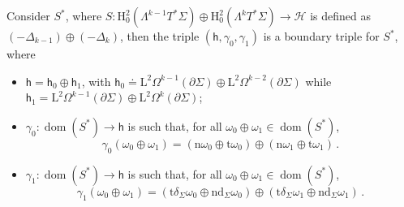 \begin{proposition}\label{Prop: boundary triples for S}
	Consider $S^*$, where $S:\mathrm{H}^2_0(\Lambda^{k-1}T^*\Sigma)\oplus \mathrm{H}^2_0(\Lambda^kT^*\Sigma)\to \mathcal{H}$ is defined as $(-\Delta_{k-1})\oplus(-\Delta_k)$, then the triple $(\mathsf{h},\gamma_0,\gamma_1)$ is a boundary triple for $S^*$, where
	\begin{itemize}
		\item
		$\mathsf{h}=\mathsf{h}_0\oplus\mathsf{h}_1$, with $\mathsf{h}_0\doteq \mathrm{L}^2\Omega^{k-1}(\partial\Sigma)\oplus \mathrm{L}^2\Omega^{k-2}(\partial\Sigma)$ while $\mathsf{h}_1=\mathrm{L}^2\Omega^{k-1}(\partial\Sigma)\oplus \mathrm{L}^2\Omega^{k}(\partial\Sigma)$; 
		\item
		$\gamma_0:\operatorname{dom}(S^*)\to\mathsf{h}$ is such that, for all $\omega_0\oplus\omega_1\in \operatorname{dom}(S^*)$, 
		\begin{equation}\label{Eq: gamma0}
		\gamma_0(\omega_0\oplus\omega_1)= (\mathrm{n}\omega_0\oplus
		\mathrm{t}\omega_0)\oplus
		(\mathrm{n}\omega_1\oplus
		\mathrm{t}\omega_1)\,.
		\end{equation}
		\item
		$\gamma_1:\operatorname{dom}(S^*)\to\mathsf{h}$ is such that, for all $\omega_0\oplus\omega_1\in \operatorname{dom}(S^*)$, 
		\begin{equation}\label{Eq: gamma1}
		\gamma_1(\omega_0\oplus\omega_1)=
		(\mathrm{t}\delta_\Sigma\omega_0\oplus
		\mathrm{n}\mathrm{d}_{\Sigma}\omega_0)\oplus
		(\mathrm{t}\delta_\Sigma\omega_1\oplus
		\mathrm{n}\mathrm{d}_{\Sigma}\omega_1)\,.
		\end{equation}
	\end{itemize}
\end{proposition}




